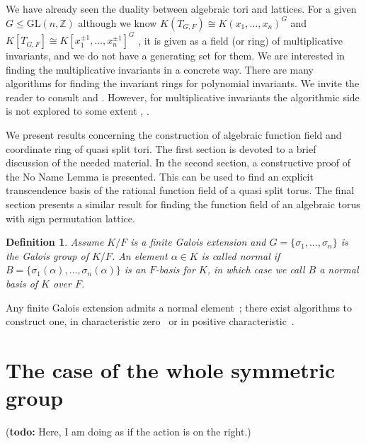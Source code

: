 \documentclass[12pt]{article}
\theoremstyle{plain}
\newtheorem{definition}[theorem]{Definition}
\def\todo#1{(\textbf{todo:} #1)}
\newcommand{\Z}{\ensuremath{\mathbb{Z}}}
\begin{document}
We have already seen the duality between algebraic tori and
lattices. For a given $G \leq \mathrm{GL}(n,\Z)$ although we know
$K(T_{G,F}) \cong K(x_1, \ldots, x_n)^G$ and $K[T_{G,F}] \cong
K[x^{\pm 1}_1, \ldots , x^{\pm 1}_n]^G$ , it is given as a field (or
ring) of multiplicative invariants, and we do not have a generating
set for them. We are interested in finding the multiplicative
invariants in a concrete way.  There are many algorithms for finding
the invariant rings for polynomial invariants. We invite the reader to
consult \cite{Kemper2} and \cite{Sturmfels}. However, for
multiplicative invariants the algorithmic side is not explored to some
extent \cite{Kemper}, \cite{Renault}.

We present results concerning the construction of algebraic function
field and coordinate ring of quasi split tori. The first section is
devoted to a brief discussion of the needed material. In the second
section, a constructive proof of the No Name Lemma is presented. This
can be used to find an explicit transcendence basis of the rational
function field of a quasi split torus. The final section presents a
similar result for finding the function field of an algebraic torus
with sign permutation lattice.

\begin{definition}
  Assume $K/F$ is a finite Galois extension and $G = \lbrace \sigma_1,
  \ldots , \sigma_n \rbrace$ is the Galois group of $K/F$. An element
  $\alpha \in K$ is called normal if $B = \lbrace \sigma_1(\alpha),
  \ldots , \sigma_n(\alpha) \rbrace$ is an $F$-basis for $K$, in which
  case we call $B$ a normal basis of $K$ over $F$.
\end{definition} 

Any finite Galois extension admits a normal element~\cite[Theorem
  6.13.1]{Lang}; there exist algorithms to construct one, in
characteristic zero~\cite{Girstmair} or in positive
characteristic~\cite{Giesbrecht,Poli}.




\section{The case of the whole symmetric group}
 
\todo{Here, I am doing as if the action is on the right.}
\end{document}

